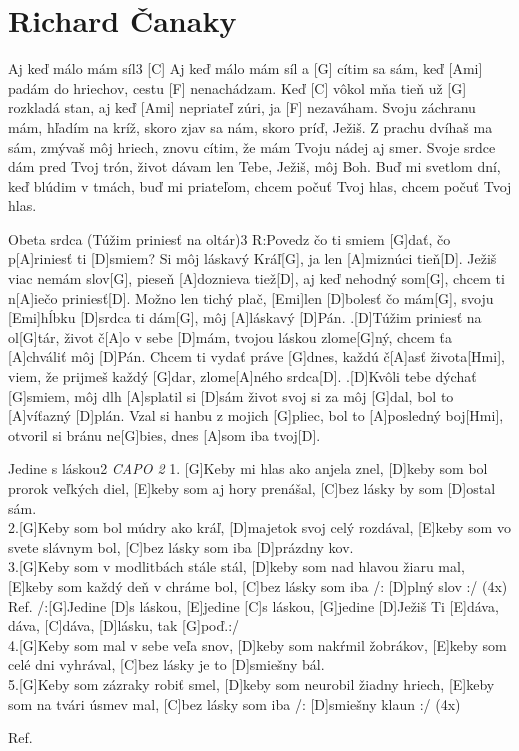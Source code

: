 \documentclass[12pt]{article}
\begin{document}
\newpage

\section{Richard Čanaky}

\begin{song}{Aj keď málo mám síl}{3}
	[C] Aj keď málo mám síl 
	a [G] cítim sa sám,
	keď [Ami] padám do hriechov, 
	cestu [F] nenachádzam.
	Keď [C] vôkol mňa tieň 
	už [G] rozkladá stan,
	aj keď [Ami] nepriateľ zúri, 
	ja [F] nezaváham.
	\columnbreak
	Svoju záchranu mám, 
	hľadím na kríž,
	skoro zjav sa nám, 
	skoro príď, Ježiš.
	Z prachu dvíhaš ma sám, 
	zmývaš môj hriech,
	znovu cítim, že mám 
	Tvoju nádej aj smer.
	\columnbreak
	Svoje srdce dám pred Tvoj 
	trón,
	život dávam len Tebe, 
	Ježiš, môj Boh.
	Buď mi svetlom dní, 
	keď blúdim v tmách,
	buď mi priateľom, 
	chcem počuť Tvoj hlas,
	chcem počuť Tvoj hlas.
\end{song}

\begin{song}{Obeta srdca (Túžim priniesť na oltár)}{3}
	R:Povedz čo ti smiem [G]dať, 
	čo p[A]riniesť ti [D]smiem?
	Si môj láskavý Kráľ[G], 
	ja len [A]miznúci tieň[D].
	Ježiš viac nemám slov[G], 
	pieseň [A]doznieva tiež[D],
	aj keď nehodný som[G], 
	chcem ti n[A]iečo priniesť[D].
	Možno len tichý plač, 
	[Emi]len [D]bolesť čo mám[G],
	svoju [Emi]hĺbku [D]srdca ti dám[G], 
	môj [A]láskavý [D]Pán.	
	.[D]Túžim priniesť na ol[G]tár, 
	život č[A]o v sebe [D]mám,
	tvojou láskou zlome[G]ný, 
	chcem ťa [A]chváliť môj [D]Pán.
	Chcem ti vydať práve [G]dnes, 
	každú č[A]asť života[Hmi],
	viem, že prijmeš každý [G]dar, 
	zlome[A]ného srdca[D].
	.[D]Kvôli tebe dýchať [G]smiem, 
	môj dlh [A]splatil si [D]sám
	život svoj si za môj [G]dal, 
	bol to [A]víťazný [D]plán.
	Vzal si hanbu z mojich [G]pliec, 
	bol to [A]posledný boj[Hmi], 
	otvoril si bránu ne[G]bies, 
	dnes [A]som iba tvoj[D].
\end{song}
	
\begin{song}{Jedine s láskou}{2}
	\textit{CAPO 2}
	1.
	[G]Keby mi hlas ako anjela znel, [D]keby som bol prorok veľkých diel,
	[E]keby som aj hory prenášal, [C]bez lásky by som [D]ostal sám.
	\\
	2.[G]Keby som bol múdry ako kráľ, [D]majetok svoj celý rozdával,
	[E]keby som vo svete slávnym bol, [C]bez lásky som iba [D]prázdny kov.
	\\
	3.[G]Keby som v modlitbách stále stál, [D]keby som nad hlavou žiaru mal,
	[E]keby som každý deň v chráme bol, [C]bez lásky som iba /: [D]plný slov :/ (4x)
	\columnbreak
	Ref.
	/:[G]Jedine [D]s láskou, [E]jedine [C]s láskou,
	[G]jedine [D]Ježiš Ti [E]dáva, dáva, [C]dáva, [D]lásku, tak [G]poď.:/ 
	\\
	4.[G]Keby som mal v sebe veľa snov, [D]keby som nakŕmil žobrákov,
	[E]keby som celé dni vyhrával, [C]bez lásky je to [D]smiešny bál.
	\\
	5.[G]Keby som zázraky robiť smel, [D]keby som neurobil žiadny hriech,
	[E]keby som na tvári úsmev mal, [C]bez lásky som iba  /: [D]smiešny klaun :/ (4x)
	
	Ref.
\end{song}
\end{document}

